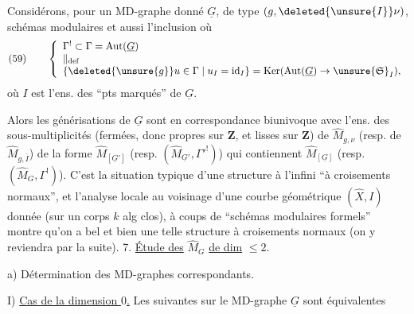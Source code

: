 Considérons, pour un MD-graphe donné $\underline{G}$, de type  $(g,\deleted{\unsure{I}}\nu)$,   schémas modulaires 
et aussi l'inclusion
où
\[
\text{(59)}\qquad
\left\{\begin{array}{l}
\Gamma^!\subset\Gamma=\operatorname{Aut}(\underline G)\\
\Vert_{\mathrm{def}}\\
\{\deleted{\unsure{g}}u\in\Gamma\mid u_I=\operatorname{id}_I\}=\operatorname{Ker}(\operatorname{Aut}(\underline G)\to\unsure{\mathfrak S}_I),
\end{array}\right.
\]
où $I$ est l'ens. des ``pts marqués'' de $\underline G$.

Alors les  générisations de $\underline G$ sont en correspondance biunivoque avec l'ens. des sous-multiplicités (fermées,  donc propres sur $\mathbf Z$, et lisses sur $\mathbf Z$) de $\widehat M_{g,\nu}$ (resp. de $\widehat M_{g,\overline I}$) de la forme $\widehat M_{[\underline G']}$ (resp. $(\widehat M_{\underline G'},\Gamma'^!)$) qui contiennent $\widehat M_{[\underline G]}$ (resp. $(\widehat M_G,\Gamma^!)$). C'est
la situation typique d'une structure à l'infini ``à croisements normaux'', et l'analyse locale  au voisinage d'une courbe géométrique $(\widehat X,I)$ donnée (sur un corps $k$ alg clos), à coups de ``schémas modulaires  formels'' montre qu'on a bel et bien une telle structure à croisements normaux (on y reviendra par la suite).
7. \uline{Étude des}  $\widehat M_G$  \uline{de dim} $\leq 2$.

a) Détermination des MD-graphes correspondants.

I) \uline{Cas de la dimension $0$.} Les   suivantes sur le MD-graphe $\underline G$ sont équivalentes

